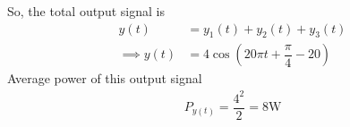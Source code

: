 \documentclass[journal,12pt,twocolumn]{IEEEtran}
\begin{document}
So, the total output signal is
\begin{align}
    y(t)&=y_1(t)+y_2(t)+y_3(t)\\
    \implies y(t)&= 4\cos\left(20\pi t+\dfrac{\pi}{4}-20\right)
\end{align}
Average power of this output signal
\begin{align}
    P_{y(t)}=\dfrac{4^2}{2}=8\text{W}
\end{align}
\end{document}
